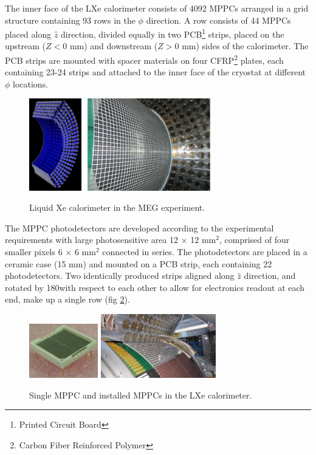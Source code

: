 The inner face of the LXe calorimeter consists of 4092 MPPCs arranged in a grid
structure containing 93 rows in the $\phi$ direction.  A row consists of 44
MPPCs placed along $\hat{z}$ direction, divided equally in two PCB\footnote{Printed
Circuit Board} strips, placed on the upstream ($Z<0$ mm) and downstream ($Z>0$
mm) sides of the calorimeter.  The PCB strips are mounted with spacer materials
on four CFRP\footnote{Carbon Fiber Reinforced Polymer} plates, each containing
23-24 strips and attached to the inner face of the cryostat at different $\phi$
locations.  
\begin{figure}
\includegraphics[height=4cm]{plots/LXeMEGUpgrade.png}
\includegraphics[height=4cm]{plots/CIMG5301}
\label{fig:calorimeter}
\caption{Liquid Xe calorimeter in the MEG experiment.}
\end{figure}
The MPPC photodetectors are developed according to the experimental
requirements with large photosensitive area 12 $\times$ 12 mm$^2$,
comprised of four  smaller pixels 6 $\times$ 6 mm$^2$ connected in
series.  The photodetectors are placed in a ceramic case (15 mm) and
mounted on a PCB strip, each containing 22 photodetectors.  Two
identically produced strips aligned along $\hat{z}$ direction, and
rotated by 180\degree with respect to each other to allow for
electronics readout at each end, make up a single row (fig 
\ref{fig:mppc}).
\begin{figure}
\includegraphics[width=3cm]{plots/single_mppc.jpg}
\includegraphics[width=5cm]{plots/CFRP_spacer_MPPC.jpg}
\caption{Single MPPC and installed MPPCs in the LXe calorimeter.}
\label{fig:mppc} 
\end{figure}


